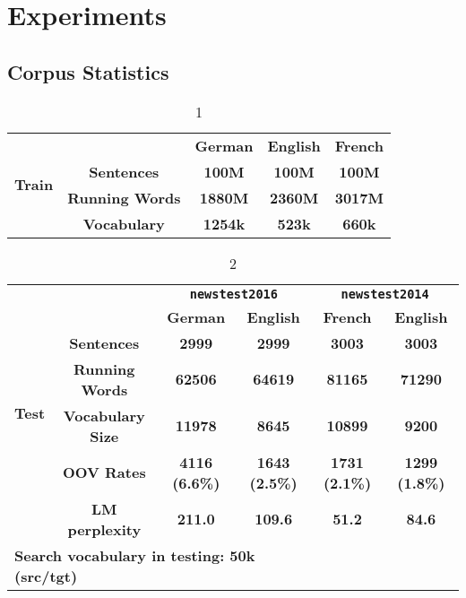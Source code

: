 \chapter{Experiments}

\section{Corpus Statistics}
\begin{table}[H]
	\centering
	\begin{tabular}{c|c|c|c|c}
		\hline
		\multirow{4}{*}{\textbf{Train}} & \textbf{}              & \textbf{German} & \textbf{English} & \textbf{French} \\ \cline{2-5} 
		& \textbf{Sentences}     & \textbf{100M}   & \textbf{100M}    & \textbf{100M}   \\ \cline{2-5} 
		& \textbf{Running Words} & \textbf{1880M}  & \textbf{2360M}   & \textbf{3017M}  \\ \cline{2-5} 
		& \textbf{Vocabulary}    & \textbf{1254k}  & \textbf{523k}    & \textbf{660k}   \\ \hline
	\end{tabular}
	\caption{1}
\end{table}

\begin{table}[H]
	\centering
	
	\begin{tabular}{c|c|c|c|c|c}
		\hline
		\multirow{7}{*}{\textbf{Test}} & \textbf{}                      & \multicolumn{2}{c|}{\textbf{\texttt{newstest2016}}}    & \multicolumn{2}{c}{\textbf{\texttt{newstest2014}}}    \\ \cline{3-6} 
		& \multicolumn{1}{l|}{\textbf{}} & \textbf{German}       & \textbf{English}      & \textbf{French}       & \textbf{English}      \\ \cline{2-6} 
		& \textbf{Sentences}             & \textbf{2999}         & \textbf{2999}         & \textbf{3003}         & \textbf{3003}         \\ \cline{2-6} 
		& \textbf{Running Words}         & \textbf{62506}        & \textbf{64619}        & \textbf{81165}        & \textbf{71290}        \\ \cline{2-6} 
		& \textbf{Vocabulary Size}       & \textbf{11978}        & \textbf{8645}         & \textbf{10899}        & \textbf{9200}         \\ \cline{2-6} 
		& \textbf{OOV Rates}             & \textbf{4116 (6.6\%)} & \textbf{1643 (2.5\%)} & \textbf{1731 (2.1\%)} & \textbf{1299 (1.8\%)} \\ \cline{2-6} 
		& \textbf{LM perplexity}         & \textbf{211.0}        & \textbf{109.6}        & \textbf{51.2}         & \textbf{84.6}         \\ \hline
		\multicolumn{4}{l}{\textbf{Search vocabulary in testing: 50k (src/tgt)}} \\
		
	\end{tabular}
	\caption{2}
\end{table}
